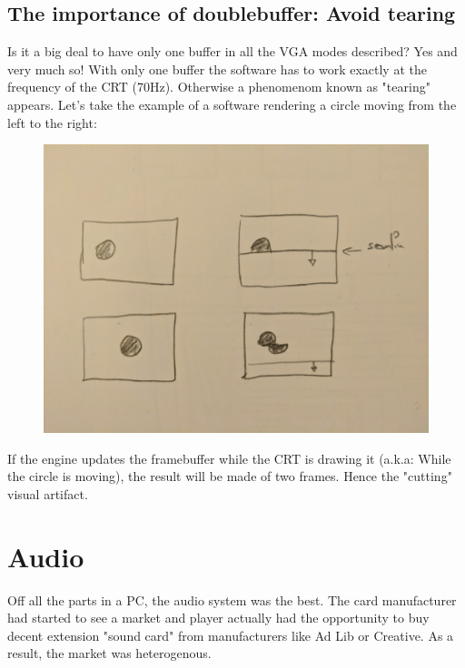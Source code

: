 \documentclass[book.tex]{subfiles}
\begin{document}
\subsection{The importance of doublebuffer: Avoid tearing}
Is it a big deal to have only one buffer in all the VGA modes described? Yes and very much so! With only one buffer the software has to work exactly at the frequency of the CRT (70Hz). Otherwise a phenomenom known as "tearing" appears. Let's take the example of a software rendering a circle moving from the left to the right:
\par
 \begin{figure}[H]
\centering
 \includegraphics[width=\textwidth]{imgs/double_buffer_explained.png}
 \end{figure}
\par
If the engine updates the framebuffer while the CRT is drawing it (a.k.a: While the circle is moving), the result will be made of two frames. Hence the "cutting" visual artifact.




\section{Audio}
Off all the parts in a PC, the audio system was the best. The card manufacturer had started to see a market and player actually had the opportunity to buy decent extension "sound card" from manufacturers like Ad Lib or Creative. As a result, the market was heterogenous.
\end{document}
